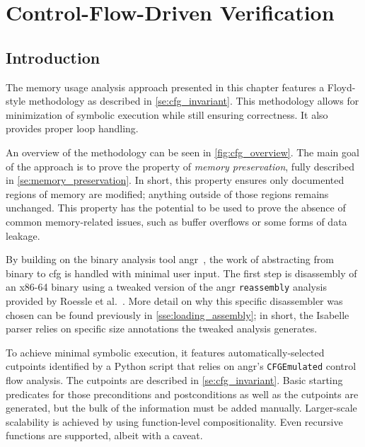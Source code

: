 \chapter{Control-Flow-Driven Verification}\label{ch:cfg}

\section{Introduction}\label{se:cfg_intro}
The memory usage analysis approach presented in this chapter
features a Floyd-style methodology as described in \cref{se:cfg_invariant}.
This methodology allows for minimization of symbolic execution
 while still ensuring correctness.
It also provides proper loop handling.

An overview of the methodology can be seen in \cref{fig:cfg_overview}.
The main goal of the approach is to prove the property of \emph{memory preservation},
fully described in \cref{se:memory_preservation}.
In short, this property ensures only documented regions of memory are modified;
anything outside of those regions remains unchanged.
This property has the potential to be used
to prove the absence of common memory-related issues,
such as buffer overflows or some forms of data leakage.

By building on the binary analysis tool angr~\citep{shoshitaishvili2016state},
the work of abstracting from binary to \ac{cfg} is handled with minimal user input.
The first step is disassembly of an x86-64 binary using
a tweaked version of the angr
\lstinline|reassembly| analysis~\citep{wang2017ramblr}
provided by Roessle et al.~\citep{roessle2019}.
More detail on why this specific disassembler was chosen
can be found previously in \cref{sse:loading_assembly}; in short,
the Isabelle parser relies on specific size annotations the tweaked analysis generates.

To achieve minimal symbolic execution,
it features automatically-selected cutpoints
identified by a Python script that relies on
angr's \lstinline|CFGEmulated| control flow analysis.
The cutpoints are described in \cref{se:cfg_invariant}.
Basic starting predicates for those preconditions and postconditions
as well as the cutpoints are generated,
but the bulk of the information must be added manually.
Larger-scale scalability is achieved by using function-level compositionality.
Even recursive functions are supported, albeit with a caveat.

